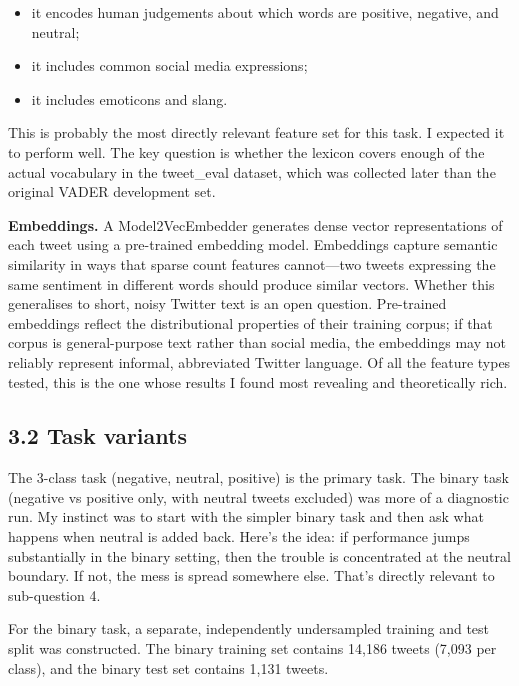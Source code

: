 \documentclass[12pt]{article}
\begin{document}
\begin{itemize}

  \item it encodes human judgements about which words are positive, negative, and neutral;

  \item it includes common social media expressions;

  \item it includes emoticons and slang.

\end{itemize} This is probably the most directly relevant feature set for this task. I expected it to perform well. The key question is whether the lexicon covers enough of the actual vocabulary in the tweet\_eval dataset, which was collected later than the original VADER development set.

\textbf{Embeddings.} A Model2VecEmbedder generates dense vector representations of each tweet using a pre-trained embedding model. Embeddings capture semantic similarity in ways that sparse count features cannot---two tweets expressing the same sentiment in different words should produce similar vectors. Whether this generalises to short, noisy Twitter text is an open question. Pre-trained embeddings reflect the distributional properties of their training corpus; if that corpus is general-purpose text rather than social media, the embeddings may not reliably represent informal, abbreviated Twitter language. Of all the feature types tested, this is the one whose results I found most revealing and theoretically rich.



\subsection*{3.2 Task variants}



The 3-class task (negative, neutral, positive) is the primary task. The binary task (negative vs positive only, with neutral tweets excluded) was more of a diagnostic run. My instinct was to start with the simpler binary task and then ask what happens when neutral is added back. Here's the idea: if performance jumps substantially in the binary setting, then the trouble is concentrated at the neutral boundary. If not, the mess is spread somewhere else. That's directly relevant to sub-question 4.

For the binary task, a separate, independently undersampled training and test split was constructed. The binary training set contains 14,186 tweets (7,093 per class), and the binary test set contains 1,131 tweets.
\end{document}
